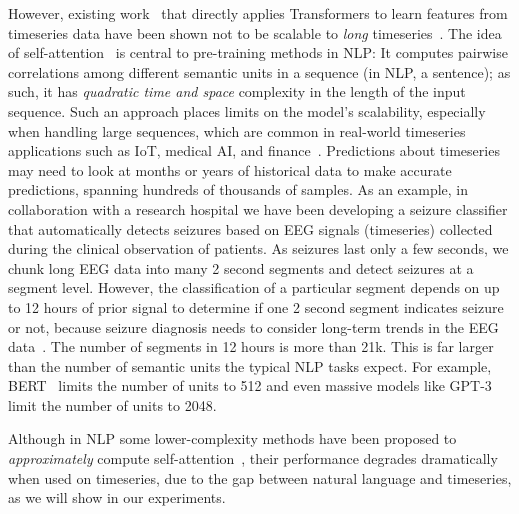 
However, existing work~\cite{DBLP:conf/kdd/ZerveasJPBE21} that directly applies Transformers to learn features from timeseries data have been shown not to be scalable to {\it long} timeseries~\cite{li2019enhancing}. The idea of self-attention~\cite{DBLP:conf/nips/VaswaniSPUJGKP17} is central to pre-training methods in NLP: It computes pairwise correlations among different semantic units in a sequence (in NLP, a sentence); as such, it has {\it quadratic time and space} complexity in the length of the input sequence. 
Such an approach places limits on the model's scalability, especially when handling large sequences,  which are common in real-world timeseries applications such as IoT, medical AI, and finance~\cite{zhou2021informer,DBLP:journals/pvldb/CaoTAJYLGSBSCWM19,liu2018open}. Predictions about timeseries may need to look at months or years of historical data to make accurate predictions, spanning hundreds of thousands of samples.  
As an example, in collaboration with a research hospital we have been developing a seizure classifier that automatically detects seizures based on EEG signals (timeseries) collected during the clinical observation of patients. As seizures last only a few seconds, we chunk long EEG data into many 2 second segments and detect seizures at a segment level. However, the classification of a particular segment depends on up to 12 hours of prior signal to determine if one 2 second segment indicates seizure or not, because seizure diagnosis needs to consider long-term trends in the EEG data~\cite{DBLP:journals/pvldb/CaoTAJYLGSBSCWM19}. The number of segments in 12 hours is more than 21k. 
This is far larger than the number of semantic units the typical NLP tasks expect. For example, BERT~\cite{DBLP:conf/naacl/DevlinCLT19} limits the number of units to 512 and even massive models like GPT-3~\cite{brown2020language} limit the number of units to 2048.

Although in NLP some lower-complexity methods have been proposed to {\it approximately} compute self-attention~\cite{kitaev2020reformer,choromanski2020rethinking,wang2020linformer}, their performance degrades dramatically when used on timeseries, due to the gap between natural language and timeseries, as we will show in our experiments.

